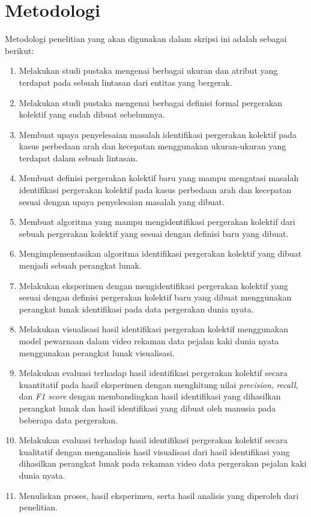 \section{Metodologi}
\label{sec:metlit}

Metodologi penelitian yang akan digunakan dalam skripsi ini adalah sebagai berikut:

\begin{enumerate}
    \item Melakukan studi pustaka mengenai berbagai ukuran dan atribut yang terdapat pada sebuah lintasan dari entitas yang bergerak.
    \item Melakukan studi pustaka mengenai berbagai definisi formal pergerakan kolektif yang sudah dibuat sebelumnya.
    \item Membuat upaya penyelesaian masalah identifikasi pergerakan kolektif pada kasus perbedaan arah dan kecepatan menggunakan ukuran-ukuran yang terdapat dalam sebuah lintasan.
    \item Membuat definisi pergerakan kolektif baru yang mampu mengatasi masalah identifikasi pergerakan kolektif pada kasus perbedaan arah dan kecepatan sesuai dengan upaya penyelesaian masalah yang dibuat.
    \item Membuat algoritma yang mampu mengidentifikasi pergerakan kolektif dari sebuah pergerakan kolektif yang sesuai dengan definisi baru yang dibuat.
    \item Mengimplementasikan algoritma identifikasi pergerakan kolektif yang dibuat menjadi sebuah perangkat lunak.
    \item Melakukan eksperimen dengan mengidentifikasi pergerakan kolektif yang sesuai dengan definisi pergerakan kolektif baru yang dibuat menggunakan perangkat lunak identifikasi pada data pergerakan dunia nyata.
    \item Melakukan visualisasi hasil identifikasi pergerakan kolektif menggunakan model pewarnaan dalam video rekaman data pejalan kaki dunia nyata menggunakan perangkat lunak visualisasi.
    \item Melakukan evaluasi terhadap hasil identifikasi pergerakan kolektif secara kuantitatif pada hasil eksperimen dengan menghitung nilai \textit{precision}, \textit{recall}, dan \textit{F1 score} dengan membandingkan hasil identifikasi yang dihasilkan perangkat lunak dan hasil identifikasi yang dibuat oleh manusia pada beberapa data pergerakan.
    \item Melakukan evaluasi terhadap hasil identifikasi pergerakan kolektif secara kualitatif dengan menganalisis hasil visualisasi dari hasil identifikasi yang dihasilkan perangkat lunak pada rekaman video data pergerakan pejalan kaki dunia nyata.
    \item Menuliskan proses, hasil eksperimen, serta hasil analisis yang diperoleh dari penelitian.
\end{enumerate}


